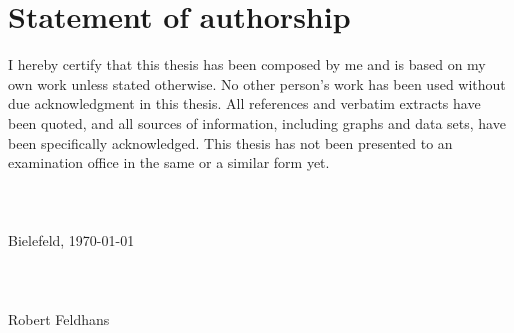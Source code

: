 


\chapter*{Statement of authorship}

I hereby certify that this thesis has been composed by me and is based on my own work unless stated otherwise. 
No other person’s work has been used without due acknowledgment in this thesis. 
All references and verbatim extracts have been quoted, and all sources of information, including graphs and data sets, have been specifically acknowledged. 
This thesis has not been presented to an examination office in the same or a similar form yet.
\\\\\\\\
Bielefeld, \today
\\\\\\\\
Robert Feldhans

